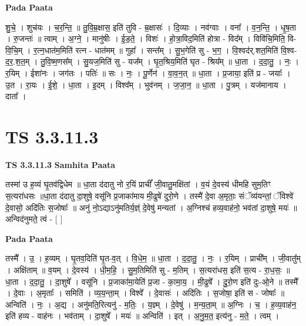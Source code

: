 \documentclass[17pt]{extarticle}
\begin{document}
\textbf{Pada Paata} \newline

शु॒चे॒ । शुच॑यः । च॒र॒न्ति॒ ॥ तु॒वि॒म्र॒क्षास॒ इति॑ तुवि - म्र॒क्षासः॑ । दि॒व्याः । नव॑ग्वाः । वना᳚ । व॒न॒न्ति॒ । धृ॒ष॒ता । रु॒जन्तः॑ ॥ त्वाम् । अ॒ग्ने॒ । मानु॑षीः । ई॒ड॒ते॒ । विशः॑ । हो॒त्रा॒विद॒मिति॑ होत्रा - विद᳚म् । विवि॑चि॒मिति॒ वि-वि॒चि॒म् । र॒त्न॒धात॑म॒मिति॑ रत्न - धात॑मम् ॥ गुहा᳚ । सन्त᳚म् । सु॒भ॒गेति॑ सु - भ॒ग॒ । वि॒श्वद॑र्.शत॒मिति॑ वि॒श्व-द॒र॒.श॒त॒म् । तु॒वि॒ष्म॒णस᳚म् । सु॒यज॒मिति॑ सु - यज᳚म् । घृ॒त॒श्रिय॒मिति॑ घृत - श्रिय᳚म् ॥ धा॒ता । द॒दा॒तु॒ । नः॒ । र॒यिम् । ईशा॑नः । जग॑तः । पतिः॑ ॥ सः । नः॒ । पू॒र्णेन॑ । वा॒व॒न॒त् ॥ धा॒ता । प्र॒जाया॒ इति॑ प्र - जयाः᳚ । उ॒त । रा॒यः । ई॒शे॒ । धा॒ता । इ॒दम् । विश्व᳚म् । भुव॑नम् । ज॒जा॒न॒ ॥ धा॒ता । पु॒त्रम् । यज॑मानाय । दाता᳚ ।  \newline




\section*{ TS 3.3.11.3 }

\textbf{TS 3.3.11.3 } \newline
\textbf{Samhita Paata} \newline

तस्मा॑ उ ह॒व्यं घृ॒तव॑द्विधेम ॥ धा॒ता द॑दातु नो र॒यिं प्राचीं᳚ जी॒वातु॒मक्षि॑तां । व॒यं दे॒वस्य॑ धीमहि सुम॒तिꣳ स॒त्यरा॑धसः ॥धा॒ता द॑दातु दा॒शुषे॒ वसू॑नि प्र॒जाका॑माय मी॒ढुषे॑ दुरो॒णे । तस्मै॑ दे॒वा अ॒मृताः॒ संॅव्य॑यन्तां॒ ॅविश्वे॑ दे॒वासो॒ अदि॑तिः स॒जोषाः᳚ ॥ अनु॑ नो॒ऽद्याऽनु॑मतिर्य॒ज्ञ्ं दे॒वेषु॑ मन्यतां । अ॒ग्निश्च॑ हव्य॒वाह॑नो॒ भव॑तां दा॒शुषे॒ मयः॑ ॥ अन्विद॑नुमते॒ त्वं - [  ] \newline

\textbf{Pada Paata} \newline

तस्मै᳚ । उ॒ । ह॒व्यम् । घृ॒तव॒दिति॑ घृ॒त-व॒त् । वि॒धे॒म॒ ॥ धा॒ता । द॒दा॒तु॒ । नः॒ । र॒यिम् । प्राची᳚म् । जी॒वातु᳚म् । अक्षि॑ताम् ॥ व॒यम् । दे॒वस्य॑ । धी॒म॒हि॒ । सु॒म॒तिमिति॑ सु - म॒तिम् । स॒त्यरा॑धस॒ इति॑ स॒त्य - रा॒ध॒सः॒ ॥ धा॒ता । द॒दा॒तु॒ । दा॒शुषे᳚ । वसू॑नि । प्र॒जाका॑मा॒येति॑ प्र॒जा - का॒मा॒य॒ । मी॒ढुषे᳚ । दु॒रो॒ण इति॑ दुः-ओ॒ने ॥ तस्मै᳚ । दे॒वाः । अ॒मृताः᳚ । समिति॑ । व्य॒य॒न्ता॒म् । विश्वे᳚ । दे॒वासः॑ । अदि॑तिः । स॒जोषा॒ इति॑ स - जोषाः᳚ ॥ अन्विति॑ । नः॒ । अ॒द्य । अनु॑मति॒रित्यनु॑ - म॒तिः॒ । य॒ज्ञ्म् । दे॒वेषु॑ । म॒न्य॒ता॒म् ॥ अ॒ग्निः । च॒ । ह॒व्य॒वाह॑न॒ इति॑ हव्य - वाह॑नः । भव॑ताम् । दा॒शुषे᳚ । मयः॑ ॥ अन्विति॑ । इत् । अ॒नु॒म॒त॒ इत्य॑नु - म॒ते॒ । त्वम् ।  \newline
\end{document}
